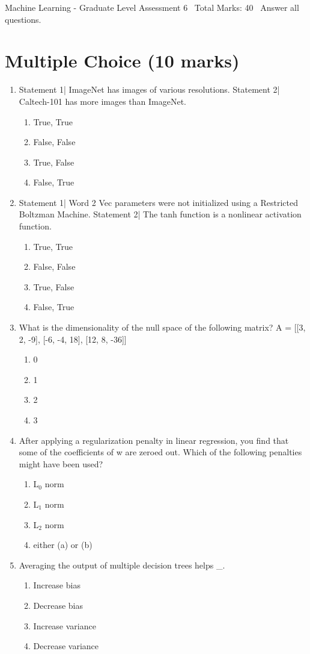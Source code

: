 \documentclass[12pt]{article}
\begin{document}
\begin{center}
Machine Learning - Graduate Level Assessment 6 \
Total Marks: 40 \
Answer all questions.
\end{center}

\section*{Multiple Choice (10 marks)}
\begin{enumerate}[label=\arabic*.]
\item Statement 1| ImageNet has images of various resolutions. Statement 2| Caltech-101 has more images than ImageNet.
\begin{enumerate}[label=(\alph*)]
    \item True, True
    \item False, False
    \item True, False
    \item False, True
\end{enumerate}
\item Statement 1| Word 2 Vec parameters were not initialized using a Restricted Boltzman Machine. Statement 2| The tanh function is a nonlinear activation function.
\begin{enumerate}[label=(\alph*)]
    \item True, True
    \item False, False
    \item True, False
    \item False, True
\end{enumerate}
\item What is the dimensionality of the null space of the following matrix? A = [[3, 2, -9], [-6, -4, 18], [12, 8, -36]]
\begin{enumerate}[label=(\alph*)]
    \item 0
    \item 1
    \item 2
    \item 3
\end{enumerate}
\item After applying a regularization penalty in linear regression, you find that some of the coefficients of w are zeroed out. Which of the following penalties might have been used?
\begin{enumerate}[label=(\alph*)]
    \item L$_{0}$ norm
    \item L$_{1}$ norm
    \item L$_{2}$ norm
    \item either (a) or (b)
\end{enumerate}
\item Averaging the output of multiple decision trees helps \_.
\begin{enumerate}[label=(\alph*)]
    \item Increase bias
    \item Decrease bias
    \item Increase variance
    \item Decrease variance
\end{enumerate}
\end{enumerate}
\end{document}

